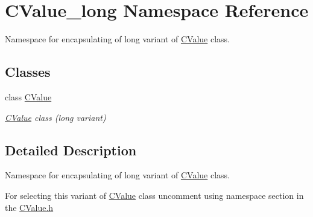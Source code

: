 \hypertarget{namespace_c_value__long}{}\section{C\+Value\+\_\+long Namespace Reference}
\label{namespace_c_value__long}


Namespace for encapsulating of {\ttfamily long} variant of \hyperlink{class_c_value__long_1_1_c_value}{C\+Value} class.  


\subsection*{Classes}
\begin{DoxyCompactItemize}
\item 
class \hyperlink{class_c_value__long_1_1_c_value}{C\+Value}
\begin{DoxyCompactList}\small\item\em \hyperlink{class_c_value__long_1_1_c_value}{C\+Value} class ({\ttfamily long} variant) \end{DoxyCompactList}\end{DoxyCompactItemize}


\subsection{Detailed Description}
Namespace for encapsulating of {\ttfamily long} variant of \hyperlink{class_c_value__long_1_1_c_value}{C\+Value} class. 

For selecting this variant of \hyperlink{class_c_value__long_1_1_c_value}{C\+Value} class uncomment {\ttfamily using} {\ttfamily namespace} section in the \hyperlink{_c_value_8h}{C\+Value.\+h} 